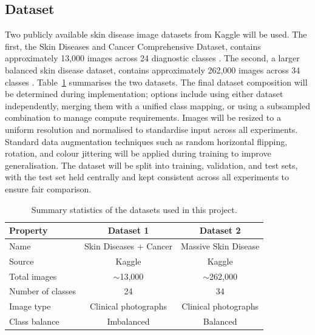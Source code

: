 \documentclass[12pt,openany,a4paper]{book}
\begin{document}
\subsection{Dataset}
Two publicly available skin disease image datasets from Kaggle will be used. The first, the Skin Diseases and Cancer Comprehensive Dataset, contains approximately 13,000 images across 24 diagnostic classes \cite{SkinDiseasesCancer}. The second, a larger balanced skin disease dataset, contains approximately 262,000 images across 34 classes \cite{MassiveSkinDisease}. Table~\ref{tab:datasets} summarises the two datasets. The final dataset composition will be determined during implementation; options include using either dataset independently, merging them with a unified class mapping, or using a subsampled combination to manage compute requirements. Images will be resized to a uniform resolution and normalised to standardise input across all experiments. Standard data augmentation techniques such as random horizontal flipping, rotation, and colour jittering will be applied during training to improve generalisation. The dataset will be split into training, validation, and test sets, with the test set held centrally and kept consistent across all experiments to ensure fair comparison. 

\begin{table}[H]
  \centering
  \caption{Summary statistics of the datasets used in this project.}
  \label{tab:datasets}
  \renewcommand{\arraystretch}{1.3}
  \begin{tabular}{|l|c|c|}
    \hline
    \textbf{Property} & \textbf{Dataset 1} & \textbf{Dataset 2} \\ \hline
    Name & Skin Diseases + Cancer & Massive Skin Disease \\ \hline
    Source & Kaggle & Kaggle \\ \hline
    Total images & $\sim$13,000 & $\sim$262,000 \\ \hline
    Number of classes & 24 & 34 \\ \hline
    Image type & Clinical photographs & Clinical photographs \\ \hline
    Class balance & Imbalanced & Balanced \\ \hline
  \end{tabular}
\end{table}
\end{document}
